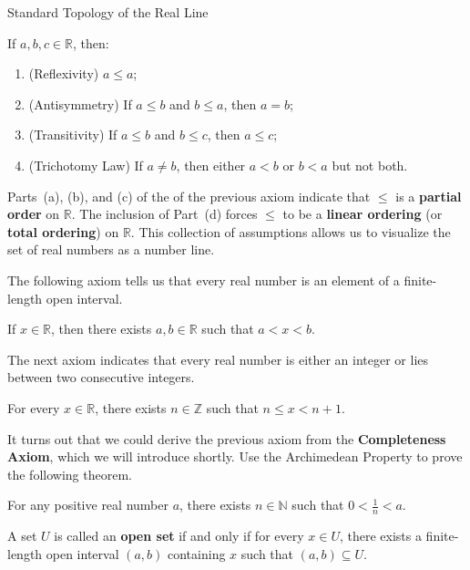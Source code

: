 \begin{section}{Standard Topology of the Real Line}
\begin{axiom}
If $a,b,c\in\mathbb{R}$, then:
\begin{enumerate}[label=\textrm{(\alph*)}]
\item (Reflexivity) $a\leq a$;
\item (Antisymmetry) If $a\leq b$ and $b\leq a$, then $a=b$;
\item (Transitivity) If $a \leq b$ and $b\leq c$, then $a\leq c$;
\item (Trichotomy Law) If $a\neq b$, then either $a<b$ or $b<a$ but not both.
\end{enumerate}
\end{axiom}

Parts~(a), (b), and (c) of the of the previous axiom indicate that $\leq$ is a \textbf{partial order} on $\mathbb{R}$. The inclusion of Part~(d) forces $\leq$ to be a \textbf{linear ordering} (or \textbf{total ordering}) on $\mathbb{R}$.  This collection of assumptions allows us to visualize the set of real numbers as a number line.

The following axiom tells us that every real number is an element of a finite-length open interval.

\begin{axiom}
If $x\in\mathbb{R}$, then there exists $a,b\in\mathbb{R}$ such that $a<x<b$.
\end{axiom}

The next axiom indicates that every real number is either an integer or lies between two consecutive integers.

\begin{axiom}
For every $x\in\mathbb{R}$, there exists $n\in\mathbb{Z}$ such that $n \leq x < n + 1$.
\end{axiom}

It turns out that we could derive the previous axiom from the \textbf{Completeness Axiom}, which we will introduce shortly. Use the Archimedean Property to prove the following theorem.

\begin{theorem}
For any positive real number $a$, there exists $n\in \mathbb{N}$ such that $0<\frac{1}{n}<a$.
\end{theorem}

\begin{definition}
A set $U$ is called an \textbf{open set} if and only if for every $x \in U$, there exists a finite-length open interval $(a,b)$ containing $x$ such that $(a,b)\subseteq U$.
\end{definition}


\end{section}
